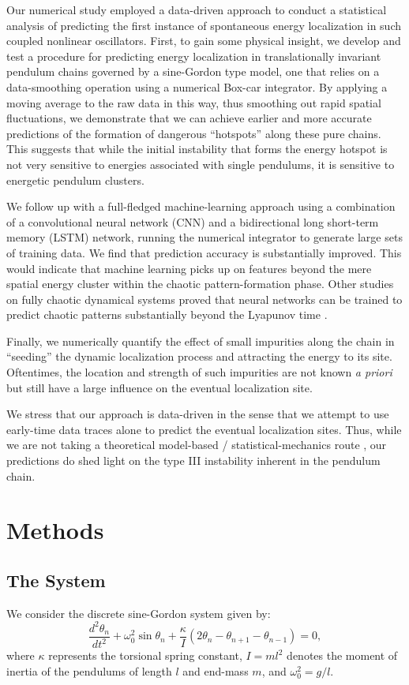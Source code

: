 \documentclass[11pt]{article}
\begin{document}
Our numerical study employed a data-driven approach to conduct a statistical analysis of predicting the first instance of spontaneous energy localization in such coupled nonlinear oscillators. First, to gain some physical insight, we develop and test a procedure for predicting energy localization in translationally invariant pendulum chains governed by a sine-Gordon type model, one that relies on a data-smoothing operation using a numerical Box-car integrator. By applying a moving average to the raw data in this way, thus smoothing out rapid spatial fluctuations, we demonstrate that we can achieve earlier and more accurate predictions of the formation of dangerous ``hotspots'' along these pure chains. This suggests that while the initial instability that forms the energy hotspot is not very sensitive to energies associated with single pendulums, it is sensitive to energetic pendulum clusters.

We follow up with a full-fledged machine-learning approach using a combination of a convolutional neural network (CNN) and a bidirectional long short-term memory (LSTM) network, running the numerical integrator to generate large sets of training data. We find that prediction accuracy is substantially improved. This would indicate that machine learning picks up on features beyond the mere spatial energy cluster within the chaotic pattern-formation phase. Other studies on fully chaotic dynamical systems proved that neural networks can be trained to predict chaotic patterns substantially beyond the Lyapunov time \cite{Chaos_Ott_2017,PhysRevLett_Ott_2018}. 

Finally, we numerically quantify the effect of small impurities along the chain in ``seeding'' the dynamic localization process and attracting the energy to its site. Oftentimes, the location and strength of such impurities are not known {\it a priori} but still have a large influence on the eventual localization site. 

We stress that our approach is data-driven in the sense that we attempt to use early-time data traces alone to predict the eventual localization sites. Thus, while we are not taking a theoretical model-based / statistical-mechanics route \cite{PhysRevE.69.016618}, our predictions do shed light on the type III instability inherent in the pendulum chain.

\section{Methods}
\subsection{The System}
We consider the discrete sine-Gordon system given by:
\begin{equation}
\label{sG}
\frac{d^2\theta_n}{dt^2}+\omega_0^2 \sin{\theta_n}+\frac{\kappa}{I}\left(2\theta_n -\theta_{n+1}-\theta_{n-1} \right)=0,
\end{equation}
where $\kappa$ represents the torsional spring constant, $I=ml^2$ denotes the moment of inertia of the pendulums of length $l$ and end-mass $m$, and $\omega_0^2=g/l$.
\end{document}
